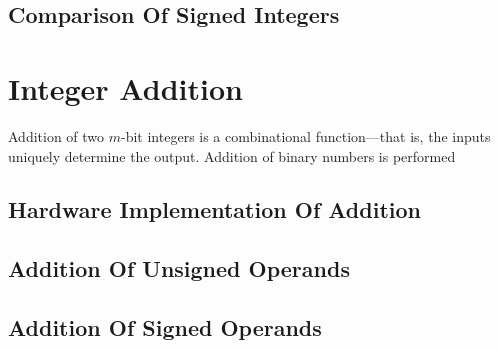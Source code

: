 \subsection{Comparison Of Signed Integers}
\label{ccil0:scsi0}


\section{Integer Addition}
\label{ccil0:siad0}

Addition of two $m$-bit integers is a combinational function---that is,
the inputs uniquely determine the output.  Addition of binary 
numbers is performed 


\subsection{Hardware Implementation Of Addition}


\subsection{Addition Of Unsigned Operands}


\subsection{Addition Of Signed Operands}


